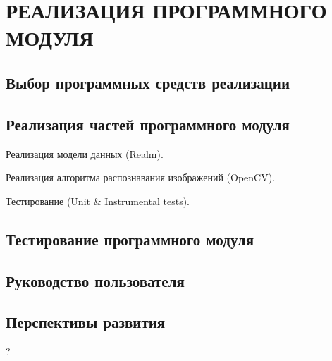 \section[Реализация программного модуля]{%
  РЕАЛИЗАЦИЯ ПРОГРАММНОГО МОДУЛЯ
}\label{sec:implementation}

\subsection{Выбор программных средств реализации}

\subsection{Реализация частей программного модуля}
Реализация  модели данных (Realm).

Реализация алгоритма распознавания изображений (OpenCV).

Тестирование (Unit \& Instrumental tests).

\subsection{Тестирование  программного модуля}

\subsection{Руководство пользователя}

\subsection{Перспективы развития}

?